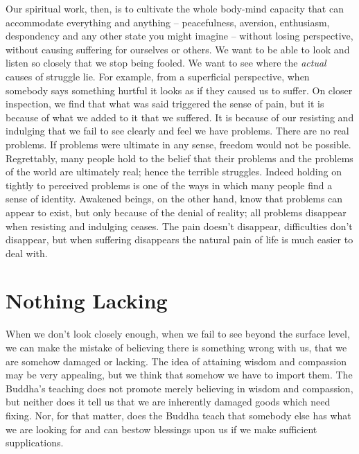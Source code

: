 Our spiritual work, then, is to cultivate the whole body-mind capacity
that can accommodate everything and anything – peacefulness, aversion,
enthusiasm, despondency and any other state you might imagine – without
losing perspective, without causing suffering for ourselves or others.
We want to be able to look and listen so closely that we stop being
fooled. We want to see where the \emph{actual} causes of struggle lie. For
example, from a superficial perspective, when somebody says something
hurtful it looks as if they caused us to suffer. On closer inspection,
we find that what was said triggered the sense of pain, but it is
because of what we added to it that we suffered. It is because of our
resisting and indulging that we fail to see clearly and feel we have
problems. There are no real problems. If problems were ultimate in any
sense, freedom would not be possible. Regrettably, many people hold to
the belief that their problems and the problems of the world are
ultimately real; hence the terrible struggles. Indeed holding on tightly
to perceived problems is one of the ways in which many people find a
sense of identity. Awakened beings, on the other hand, know that
problems can appear to exist, but only because of the denial of reality;
all problems disappear when resisting and indulging ceases. The pain
doesn’t disappear, difficulties don’t disappear, but when suffering
disappears the natural pain of life is much easier to deal with.

\section{Nothing Lacking}

When we don’t look closely enough, when we fail to see beyond the
surface level, we can make the mistake of believing there is something
wrong with us, that we are somehow damaged or lacking. The idea of
attaining wisdom and compassion may be very appealing, but we think that
somehow we have to import them. The Buddha’s teaching does not promote
merely believing in wisdom and compassion, but neither does it tell us
that we are inherently damaged goods which need fixing. Nor, for that
matter, does the Buddha teach that somebody else has what we are looking
for and can bestow blessings upon us if we make sufficient
supplications.

